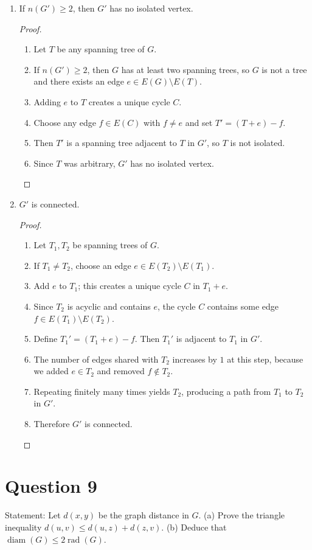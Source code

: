 \documentclass[11pt]{article}
\newcommand{\diam}{\operatorname{diam}}
\newcommand{\rad}{\operatorname{rad}}
\begin{document}
\begin{enumerate}
\item[(d)] If $n(G')\ge 2$, then $G'$ has no isolated vertex.
\begin{proof}
~
\begin{enumerate}
\item Let $T$ be any spanning tree of $G$.
\item If $n(G')\ge 2$, then $G$ has at least two spanning trees, so $G$ is not a tree and there exists an edge $e\in E(G)\setminus E(T)$.
\item Adding $e$ to $T$ creates a unique cycle $C$.
\item Choose any edge $f\in E(C)$ with $f\neq e$ and set $T'=(T+e)-f$.
\item Then $T'$ is a spanning tree adjacent to $T$ in $G'$, so $T$ is not isolated.
\item Since $T$ was arbitrary, $G'$ has no isolated vertex.
\end{enumerate}
\end{proof}

\item[(e)] $G'$ is connected.
\begin{proof}
~
\begin{enumerate}
\item Let $T_1,T_2$ be spanning trees of $G$.
\item If $T_1\neq T_2$, choose an edge $e\in E(T_2)\setminus E(T_1)$.
\item Add $e$ to $T_1$; this creates a unique cycle $C$ in $T_1+e$.
\item Since $T_2$ is acyclic and contains $e$, the cycle $C$ contains some edge $f\in E(T_1)\setminus E(T_2)$.
\item Define $T_1'=(T_1+e)-f$. Then $T_1'$ is adjacent to $T_1$ in $G'$.
\item The number of edges shared with $T_2$ increases by $1$ at this step, because we added $e\in T_2$ and removed $f\notin T_2$.
\item Repeating finitely many times yields $T_2$, producing a path from $T_1$ to $T_2$ in $G'$.
\item Therefore $G'$ is connected.
\end{enumerate}
\end{proof}
\end{enumerate}

\newpage

\section*{Question 9}
Statement: Let $d(x,y)$ be the graph distance in $G$.
(a) Prove the triangle inequality $d(u,v)\le d(u,z)+d(z,v)$.
(b) Deduce that $\diam(G)\le 2\rad(G)$.
\end{document}
